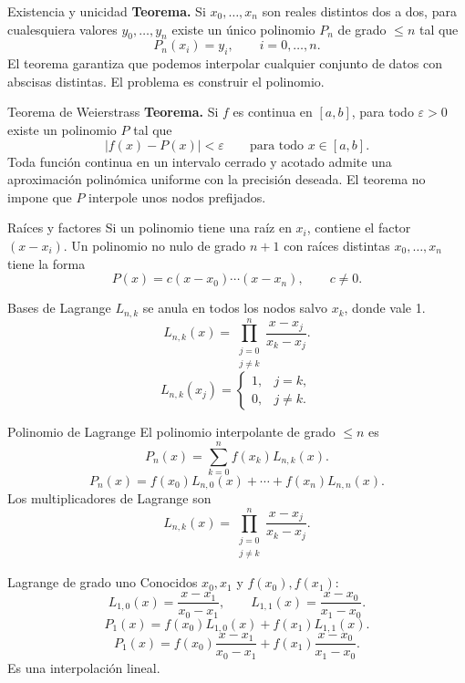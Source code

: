 \documentclass[main.tex]{subfiles}
\begin{document}
\begin{frame}[t]{Existencia y unicidad}
\textbf{Teorema.} Si $x_0,\ldots,x_n$ son reales distintos dos a dos, para cualesquiera valores $y_0,\ldots,y_n$ existe un único polinomio $P_n$ de grado $\le n$ tal que
\[P_n(x_i)=y_i,\qquad i=0,\ldots,n.\]
\bigskip
El teorema garantiza que podemos interpolar cualquier conjunto de datos con abscisas distintas.
\medskip
El problema es construir el polinomio.
\end{frame}
\begin{frame}[t]{Teorema de Weierstrass}
\textbf{Teorema.} Si $f$ es continua en $[a,b]$, para todo $\varepsilon>0$ existe un polinomio $P$ tal que
\[|f(x)-P(x)|<\varepsilon\qquad\text{para todo }x\in[a,b].\]
\bigskip
Toda función continua en un intervalo cerrado y acotado admite una aproximación polinómica uniforme con la precisión deseada.
\medskip
El teorema no impone que $P$ interpole unos nodos prefijados.
\end{frame}
\begin{frame}[t]{Raíces y factores}
Si un polinomio tiene una raíz en $x_i$, contiene el factor $(x-x_i)$.
\medskip
Un polinomio no nulo de grado $n+1$ con raíces distintas $x_0,\ldots,x_n$ tiene la forma
\[P(x)=c(x-x_0)\cdots(x-x_n),\qquad c\ne0.\]
\end{frame}
\begin{frame}[t]{Bases de Lagrange}
\small $L_{n,k}$ se anula en todos los nodos salvo $x_k$, donde vale 1.
\[L_{n,k}(x)=\prod_{\substack{j=0\\j\ne k}}^n\frac{x-x_j}{x_k-x_j}.\]\[L_{n,k}(x_j)=\begin{cases}1,&j=k,\\0,&j\ne k.\end{cases}\]
\end{frame}
\begin{frame}[t]{Polinomio de Lagrange}
El polinomio interpolante de grado $\le n$ es
\[P_n(x)=\sum_{k=0}^n f(x_k)L_{n,k}(x).\]\[P_n(x)=f(x_0)L_{n,0}(x)+\cdots+f(x_n)L_{n,n}(x).\]
Los multiplicadores de Lagrange son
\[L_{n,k}(x)=\prod_{\substack{j=0\\j\ne k}}^n\frac{x-x_j}{x_k-x_j}.\]
\end{frame}
\begin{frame}[t]{Lagrange de grado uno}
\small Conocidos $x_0,x_1$ y $f(x_0),f(x_1)$:
\[L_{1,0}(x)=\frac{x-x_1}{x_0-x_1},\qquad
L_{1,1}(x)=\frac{x-x_0}{x_1-x_0}.\]
\[P_1(x)=f(x_0)L_{1,0}(x)+f(x_1)L_{1,1}(x).\]
\[P_1(x)=f(x_0)\frac{x-x_1}{x_0-x_1}+f(x_1)\frac{x-x_0}{x_1-x_0}.\]
Es una interpolación lineal.
\end{frame}
\end{document}
